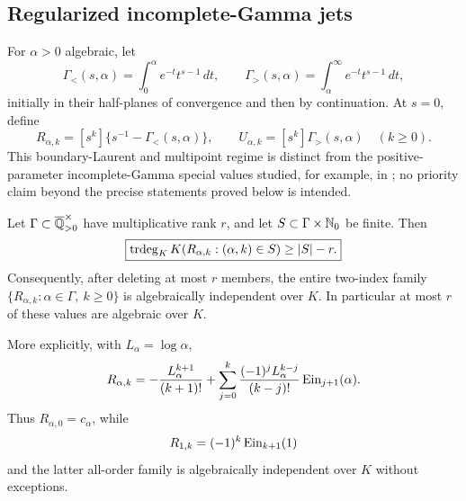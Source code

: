 \subsection*{Regularized incomplete-Gamma jets}

For \(\alpha>0\) algebraic, let
\[
 \Gamma_{<}(s,\alpha)=\int_0^\alpha e^{-t}t^{s-1}\,dt,
 \qquad
 \Gamma_{>}(s,\alpha)=\int_\alpha^\infty e^{-t}t^{s-1}\,dt,
\]
initially in their half-planes of convergence and then by continuation.
At \(s=0\), define
\begin{equation}\label{eq:incomplete-gamma-jets}
 R_{\alpha,k}=[s^k]\{s^{-1}-\Gamma_{<}(s,\alpha)\},
 \qquad
 U_{\alpha,k}=[s^k]\Gamma_{>}(s,\alpha)
 \quad(k\ge0).
\end{equation}
This boundary-Laurent and multipoint regime is distinct from the
positive-parameter incomplete-Gamma special values studied, for example,
in \cite{MurtySaha2015}; no priority claim beyond the precise statements
proved below is intended.

\begin{theorem}
\label{thm:lower-gamma-jets}
Let \(\Gamma\subset\overline{\mathbb Q}_{>0}^{\times}\) have multiplicative rank \(r\),
and let \(S\subset\Gamma\times\mathbb N_0\) be finite.  Then
\begin{equation}\label{eq:lower-gamma-jet-defect}
 \boxed{\displaystyle
 \operatorname{trdeg}_KK(R_{\alpha,k}:(\alpha,k)\in S)\ge |S|-r.}
\end{equation}
Consequently, after deleting at most \(r\) members, the entire two-index
family \(\{R_{\alpha,k}:\alpha\in\Gamma,\ k\ge0\}\) is algebraically
independent over \(K\).  In particular at most \(r\) of these values are
algebraic over \(K\).

More explicitly, with \(L_\alpha=\log\alpha\),
\begin{equation}\label{eq:lower-gamma-jet-explicit}
 R_{\alpha,k}=-\frac{L_\alpha^{k+1}}{(k+1)!}
 +\sum_{j=0}^k\frac{(-1)^jL_\alpha^{k-j}}{(k-j)!}
 \operatorname{Ein}_{j+1}(\alpha).
\end{equation}
Thus \(R_{\alpha,0}=c_\alpha\), while
\begin{equation}\label{eq:lower-gamma-at-one}
 R_{1,k}=(-1)^k\operatorname{Ein}_{k+1}(1)
\end{equation}
and the latter all-order family is algebraically independent over \(K\)
without exceptions.
\end{theorem}

